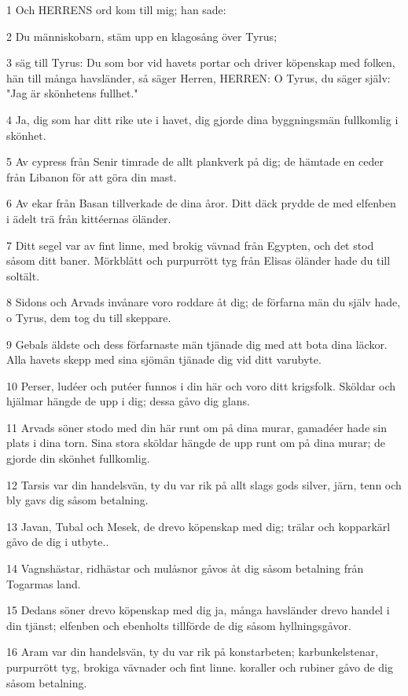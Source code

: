 \par 1 Och HERRENS ord kom till mig; han sade:
\par 2 Du människobarn, stäm upp en klagosång över Tyrus;
\par 3 säg till Tyrus: Du som bor vid havets portar och driver köpenskap med folken, hän till många havsländer, så säger Herren, HERREN: O Tyrus, du säger själv: "Jag är skönhetens fullhet."
\par 4 Ja, dig som har ditt rike ute i havet, dig gjorde dina byggningsmän fullkomlig i skönhet.
\par 5 Av cypress från Senir timrade de allt plankverk på dig; de hämtade en ceder från Libanon för att göra din mast.
\par 6 Av ekar från Basan tillverkade de dina åror. Ditt däck prydde de med elfenben i ädelt trä från kittéernas öländer.
\par 7 Ditt segel var av fint linne, med brokig vävnad från Egypten, och det stod såsom ditt baner. Mörkblått och purpurrött tyg från Elisas öländer hade du till soltält.
\par 8 Sidons och Arvads invånare voro roddare åt dig; de förfarna män du själv hade, o Tyrus, dem tog du till skeppare.
\par 9 Gebals äldste och dess förfarnaste män tjänade dig med att bota dina läckor. Alla havets skepp med sina sjömän tjänade dig vid ditt varubyte.
\par 10 Perser, ludéer och putéer funnos i din här och voro ditt krigsfolk. Sköldar och hjälmar hängde de upp i dig; dessa gåvo dig glans.
\par 11 Arvads söner stodo med din här runt om på dina murar, gamadéer hade sin plats i dina torn. Sina stora sköldar hängde de upp runt om på dina murar; de gjorde din skönhet fullkomlig.
\par 12 Tarsis var din handelsvän, ty du var rik på allt slags gods silver, järn, tenn och bly gavs dig såsom betalning.
\par 13 Javan, Tubal och Mesek, de drevo köpenskap med dig; trälar och kopparkärl gåvo de dig i utbyte..
\par 14 Vagnshästar, ridhästar och mulåsnor gåvos åt dig såsom betalning från Togarmas land.
\par 15 Dedans söner drevo köpenskap med dig ja, många havsländer drevo handel i din tjänst; elfenben och ebenholts tillförde de dig såsom hyllningsgåvor.
\par 16 Aram var din handelsvän, ty du var rik på konstarbeten; karbunkelstenar, purpurrött tyg, brokiga vävnader och fint linne. koraller och rubiner gåvo de dig såsom betalning.
